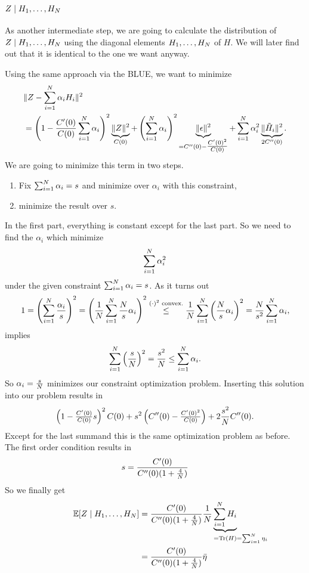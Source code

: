\subsection{\texorpdfstring{\(Z\mid H_1,\dots,H_N\)}{Z|H1,...,HN}}

As another intermediate step, we are going to calculate the distribution of
\(Z\mid H_1,\dots,H_N\) using the diagonal elements
\(H_1,\dots,H_N\) of \(H\). We will later find out that it is identical
to the one we want anyway.

Using the same approach via the BLUE, we want to minimize
\[
	\begin{aligned}
	&\|Z - \sum_{i=1}^N\alpha_i H_i \|^2\\
	&= \left(1- \frac{C'(0)}{C(0)}\sum_{i=1}^N \alpha_i\right)^2
	\underbrace{\|Z\|^2}_{C(0)}
	+  \left(\sum_{i=1}^N \alpha_i\right)^2 \underbrace{\|\epsilon\|^2}_{
		=C''(0)-\tfrac{C'(0)^2}{C(0)}
	}
	+ \sum_{i=1}^N \alpha_i^2 \underbrace{\|\tilde{H}_i\|^2}_{2C''(0)}.
	\end{aligned}
\]
We are going to minimize this term in two steps.
\begin{enumerate}
	\item Fix \(\sum_{i=1}^N \alpha_i = s\) and minimize over
	\(\alpha_i\) with this constraint,
	\item minimize the result over \(s\).
\end{enumerate}
In the first part, everything is constant except for the last part. So
we need to find the \(\alpha_i\) which minimize
\[
	\sum_{i=1}^N \alpha_i^2
\]
under the given constraint \(\sum_{i=1}^N \alpha_i = s\). As it turns
out
\[
	1 = \left(\sum_{i=1}^N \frac{\alpha_i}s\right)^2
	= \left(\frac1{N}\sum_{i=1}^N \frac{N}{s}\alpha_i\right)^2
	\overset{(\cdot)^2 \text{ convex.}}\le \frac1{N} \sum_{i=1}^N 
	\left(\frac{N}{s}\alpha_i\right)^2
	= \frac{N}{s^2} \sum_{i=1}^N \alpha_i,
\]
implies
\[
	\sum_{i=1}^N \left(\frac{s}{N}\right)^2 = \frac{s^2}{N}
	\le \sum_{i=1}^N \alpha_i.
\]
So \(\alpha_i=\frac{s}{N}\) minimizes our constraint optimization problem.
Inserting this solution into our problem results in
\[
	\left(1- \tfrac{C'(0)}{C(0)}s\right)^2
	C(0)
	+  s^2 \left(
		C''(0)-\tfrac{C'(0)^2}{C(0)}
	\right)
	+ 2\frac{s^2}{N} C''(0).
\]
Except for the last summand this is the same optimization problem as before.
The first order condition results in
\[
	s = \frac{C'(0)}{C''(0)(1+\tfrac4{N})}
\]
So we finally get
\begin{align*}
	\E[\rf\mid H_1,\dots,H_\dims]
	&= \frac{\sqC'(0)}{\sqC''(0)(1+\tfrac4{\dims})}
	\frac1\dims\underbrace{\sum_{i=1}^\dims H_i}_{
		=\trace(H) \mathrlap{=\sum_{i=1}^\dims\evH_i}
	}\\
	&= \frac{\sqC'(0)}{\sqC''(0)(1+\tfrac4{\dims})}
	\bar{\evH}
\end{align*}
